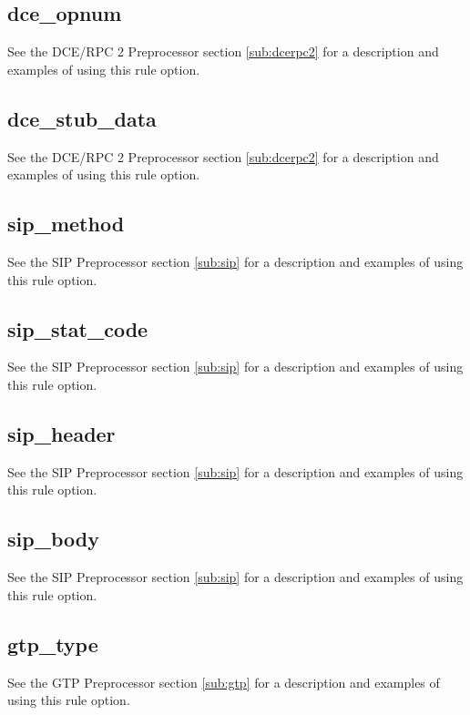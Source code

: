 \documentclass[english]{report}
\begin{document}
\subsection{dce\_opnum}

See the DCE/RPC 2 Preprocessor section \ref{sub:dcerpc2} for a description and
examples of using this rule option.

\subsection{dce\_stub\_data}

See the DCE/RPC 2 Preprocessor section \ref{sub:dcerpc2} for a description and
examples of using this rule option.

\subsection{sip\_method}

See the SIP Preprocessor section \ref{sub:sip} for a description and
examples of using this rule option.

\subsection{sip\_stat\_code}

See the SIP Preprocessor section \ref{sub:sip} for a description and
examples of using this rule option.

\subsection{sip\_header}

See the SIP Preprocessor section \ref{sub:sip} for a description and
examples of using this rule option.

\subsection{sip\_body}

See the SIP Preprocessor section \ref{sub:sip} for a description and
examples of using this rule option.

\subsection{gtp\_type}

See the GTP Preprocessor section \ref{sub:gtp} for a description and
examples of using this rule option.
\end{document}
